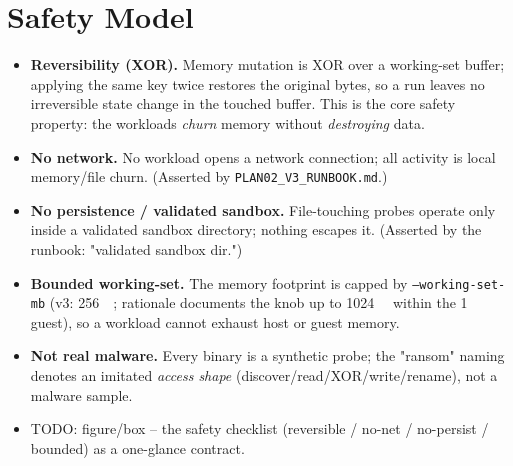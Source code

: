\documentclass[conference]{IEEEtran}
\begin{document}
\section{Safety Model}
\label{sec:safety}
\begin{itemize}
  \item \textbf{Reversibility (XOR).} Memory mutation is XOR over a working-set
        buffer; applying the same key twice restores the original bytes, so a
        run leaves no irreversible state change in the touched buffer. This is
        the core safety property: the workloads \emph{churn} memory without
        \emph{destroying} data.
  \item \textbf{No network.} No workload opens a network connection; all
        activity is local memory/file churn. (Asserted by
        \texttt{PLAN02\_V3\_RUNBOOK.md}.)
  \item \textbf{No persistence / validated sandbox.} File-touching probes
        operate only inside a validated sandbox directory; nothing escapes it.
        (Asserted by the runbook: "validated sandbox dir.")
  \item \textbf{Bounded working-set.} The memory footprint is capped by
        \texttt{--working-set-mb} (v3: \SI{256}{\mebi\byte}; rationale documents
        the knob up to \SI{1024}{\mebi\byte} within the \SI{1}{\gibi\byte}
        guest), so a workload cannot exhaust host or guest memory.
  \item \textbf{Not real malware.} Every binary is a synthetic probe; the
        "ransom" naming denotes an imitated \emph{access shape}
        (discover/read/XOR/write/rename), not a malware sample.
  \item TODO: figure/box -- the safety checklist (reversible / no-net /
        no-persist / bounded) as a one-glance contract.
\end{itemize}

\end{document}
